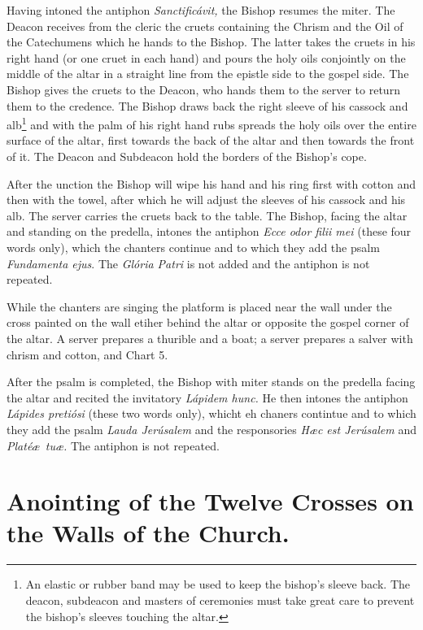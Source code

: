 \documentclass[letterpaper]{report}
\begin{document}
{\rubric Having intoned the antiphon \textit{Sanctificávit,} the Bishop resumes
the miter. The Deacon receives from the cleric the cruets containing the Chrism
and the Oil of the Catechumens which he hands to the Bishop. The latter takes
the cruets in his right hand (or one cruet in each hand) and pours the holy
oils conjointly on the middle of the altar in a straight line from the epistle
side to the gospel side. The Bishop gives the cruets to the Deacon, who hands
them to the server to return them to the credence. The Bishop draws back the
right sleeve of his cassock and alb\footnote{An elastic or rubber band may be
used to keep the bishop's sleeve back. The deacon, subdeacon and masters of
ceremonies must take great care to prevent the bishop's sleeves touching the
altar.} and with the palm of his right hand rubs spreads the holy oils over the
entire surface of the altar, first towards the back of the altar and then
towards the front of it. The Deacon and Subdeacon hold the borders of the
Bishop's cope.

\rubric After the unction the Bishop will wipe his hand and his ring first with
cotton and then with the towel, after which he will adjust the sleeves of his
cassock and his alb. The server carries the cruets back to the table. The
Bishop, facing the altar and standing on the predella, intones the antiphon
\textit{Ecce odor filii mei} (these four words only), which the chanters
continue and to which they add the psalm \textit{Fundamenta ejus}. The
\textit{Glória Patri} is not added and the antiphon is not repeated.

While the chanters are singing the platform is placed near the wall under the
cross painted on the wall etiher behind the altar or opposite the gospel corner
of the altar. A server prepares a thurible and a boat; a server prepares a
salver with chrism and cotton, and Chart 5.

\rubric After the psalm is completed, the Bishop with miter stands on the
predella facing the altar and recited the invitatory \textit{Lápidem hunc.} He
then intones the antiphon \textit{Lápides pretiósi} (these two words only),
whicht eh chaners contintue and to which they add the psalm \textit{Lauda
Jerúsalem} and the responsories \textit{H\ae c est Jerúsalem} and
\textit{Platé\ae\ tu\ae.} The antiphon is not repeated.

\section{Anointing of the Twelve Crosses on the Walls of the Church.}

}
\end{document}
